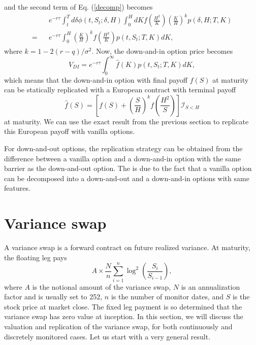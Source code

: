 \documentclass[12pt]{article}
\begin{document}
  and the second term of Eq. (\ref{decomp}) becomes
  \begin{eqnarray}
      &&e^{-r\tau}\int_t^Td\delta \phi(t,S_t;\delta,H)\int_0^HdK f\left(\frac{H^2}{K}\right)\left(\frac{K}{H}\right)^kp\left(\delta,H;T,K\right)\nonumber\\
    = &&e^{-r\tau}\int_0^H \left(\frac{K}{H}\right)^kf\left(\frac{H^2}{K}\right)p\left(t, S_t;T,K\right)dK,
  \end{eqnarray}
  where $k=1-2(r-q)/\sigma^2$. Now, the down-and-in option price becomes
  \begin{equation}
    V_{DI} = e^{-r\tau}\int_0^{\infty} \hat{f}(K)p\left(t, S_t;T,K\right)dK,
  \end{equation}
  which means that the down-and-in option with final payoff $f(S)$ at maturity can be statically replicated with
  a European contract with terminal payoff \cite{CarrChou}
  \begin{equation}
    \hat{f}(S) = \left[f(S) + \left(\frac{S}{H}\right)^kf\left(\frac{H^2}{S}\right)\right]\mathcal{I}_{S<H}
  \end{equation}
  at maturity. We can use the exact result from the previous section to replicate this European payoff with vanilla options.

  For down-and-out options, the replication strategy can be obtained from the difference between a
  vanilla option and a down-and-in option with the same barrier
  as the down-and-out option. The is due to the fact that a vanilla option can be decomposed into a 
  down-and-out and a down-and-in options with same features.

\section{Variance swap}

  A variance swap is a forward contract on future realized variance. At maturity, the floating leg pays
  \begin{equation}
    A\times\frac{N}{n}\sum_{i=1}^{n}\log^2\left(\frac{S_i}{S_{i-1}}\right),
  \end{equation}
  where $A$ is the notional amount of the variance swap, $N$ is an annualization factor and is usually set to
  252, $n$ is the number of monitor dates, and $S$ is the stock price at market close. The fixed leg payment is
  so determined that the variance swap has zero value at inception. In this section, we will discuss the valuation
  and replication of the variance swap, for both continuously and discretely monitored cases. Let us start with
  a very general result.
\end{document}
